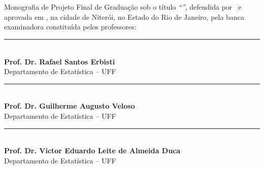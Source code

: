 \documentclass[12pt,a4paper,header]{abnt}
\begin{document}
\begin{folhadeaprovacao}

\thispagestyle{logouff}

\hspace{.2\textwidth} %
\begin{minipage}{.7\textwidth}

\begin{flushright}

{\large \bf \ABNTautordata}\\[1cm]

{\large \bf \ABNTtitulodata}\\[1cm]

\end{flushright}
Monografia de Projeto Final de Graduação sob o título \textit{``\ABNTtitulodata''},
defendida por \ABNTautordata~e aprovada em \ABNTdatadata, na cidade de Niterói,
no Estado do Rio de Janeiro, pela banca examinadora constituída pelos
professores:
\begin{flushright}

\begin{espacosimples}





\vspace{1.5cm}
\noindent\rule{10cm}{0.4pt}\\
{\bf Prof. Dr. Rafael Santos Erbisti}\\
Departamento de Estatística -- UFF\\


\vspace{1.5cm}
\noindent\rule{10cm}{0.4pt}\\
{\bf Prof. Dr. Guilherme Augusto Veloso}\\
Departamento de Estatística -- UFF\\


\vspace{1.5cm}
\noindent\rule{10cm}{0.4pt}\\
{\bf Prof. Dr. Victor Eduardo Leite de Almeida Duca}\\
Departamento de Estatística -- UFF\\


\end{espacosimples}
\end{flushright}
\end{minipage}
\end{folhadeaprovacao}
\end{document}
